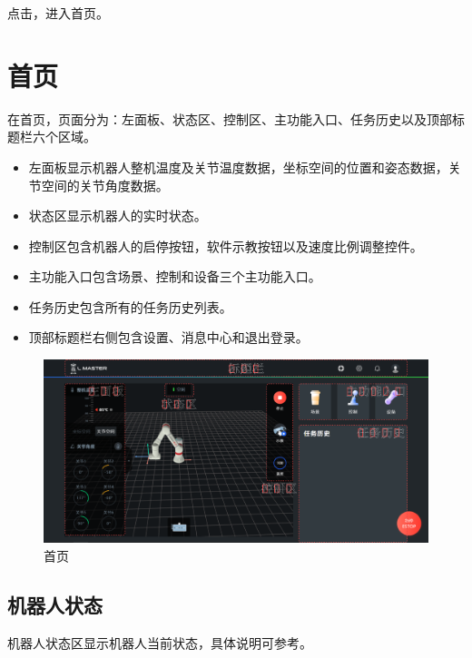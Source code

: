 点击，进入\LM 首页。

\clearpage

\section{首页}

在\LM 首页，页面分为：左面板、状态区、控制区、主功能入口、任务历史以及顶部标题栏六个区域。

\begin{itemize}
\item 左面板显示机器人整机温度及关节温度数据，坐标空间的位置和姿态数据，关节空间的关节角度数据。
\item 状态区显示机器人的实时状态。
\item 控制区包含机器人的启停按钮，软件示教按钮以及速度比例调整控件。
\item 主功能入口包含场景、控制和设备三个主功能入口。
\item 任务历史包含所有的任务历史列表。
\item 顶部标题栏右侧包含设置、消息中心和退出登录。
\end{itemize}

\begin{figure}[ht]
	\centering
	\includegraphics[width=\textwidth]{shots/home.pdf}
	\caption{\LM 首页}
	\label{fig:LM首页}
\end{figure}

\clearpage

\subsection{机器人状态}

机器人状态区显示机器人当前状态，具体说明可参考。

